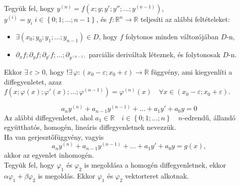 \documentclass[main.tex]{subfiles}
\begin{document}

Tegyük fel, hogy $y^{(n)} = f \left(
  x; y; y'; y''; \dots; y^{(n-1)}
  \right)$, $y^{(i)} = y_i \; i \in \left\{
  0; 1; \dots; n-1
  \right\}$, és $f: \mathbb{R}^{n} \rightarrow
  \mathbb{R}$ teljesíti az alábbi feltételeket:
\begin{itemize}
  \item $\exists \left(
          x_0; y_0; y_1; \dots; y_{n-1}
          \right) \in D$, hogy $f$ folytonos
        minden változójában $D$-n,

  \item $\partial_x f ; \partial_y f;
          \partial_{y'} f; \dots; \partial_{y^{(n-1)}}$
        parciális deriváltak léteznek,
        és folytonosak $D$-n.
\end{itemize}

Ekkor $\exists \, \varepsilon > 0$, hogy $!\exists \,
  \varphi: (x_0 - \varepsilon; x_0 + \varepsilon)
  \rightarrow \mathbb{R}$ függvény, ami kiegyenlíti
a diffegyenletet, azaz $f \left(
  x; \varphi(x); \varphi'(x); \dots; \varphi^{(n-1)}
  \right) = \varphi^{(n)}(x) \quad \forall x \in
  (x_0 - \varepsilon; x_0 + \varepsilon)$.

\begin{equation*}
  a_n y^{(n)}
  + a_{n-1} y^{(n-1)}
  + \dots
  + a_1 y'
  + a_0 y
  = 0
\end{equation*}
Az alábbi diffegyenletet, ahol $a_1 \in \mathbb{R}
  \quad i \in \left\{ 0; 1; \dots; n \right\} \quad
  n$-edrendű, állandó együtthatós, homogén, lineáris
diffegyenletnek nevezzük.
\\[2mm]
Ha van gerjesztőfüggvény, vagyis
\begin{equation*}
  a_n y^{(n)}
  + a_{n-1} y^{(n-1)}
  + \dots
  + a_1 y'
  + a_0 y
  = g(x),
\end{equation*}
akkor az egyenlet inhomogén.
\\[1em]
Tegyük fel, hogy $\varphi_1$ és $\varphi_2$ is megoldása
a homogén diffegyenletnek, ekkor $\alpha \varphi_1
  + \beta \varphi_2$ is megoldás. Ekkor $\varphi_1$ és
$\varphi_2$ vektorteret alkotnak.
\end{document}
